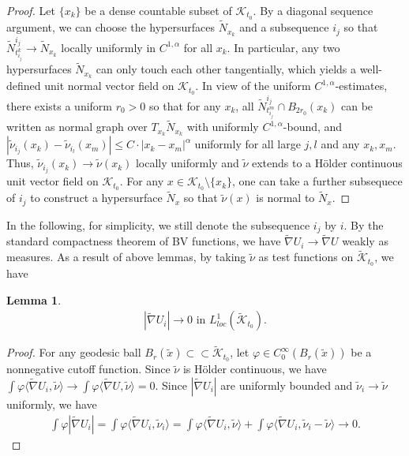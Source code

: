 \documentclass[11pt, letterpaper]{amsart}
\newtheorem{lem}[thm]{Lemma}
\theoremstyle{definition}
\theoremstyle{remark}
\begin{document}
\begin{appendix}
\begin{proof}
Let $\{x_k\} $ be a dense countable subset of $\mathcal{K}_{t_0}$. By a diagonal sequence argument, we can choose the hypersurfaces $\tilde{N}_{x_k}$ and a subsequence $i_j$ so that $\tilde{N}^{i_j}_{t ^{k}_{i_j}} \to \tilde{N}_{x_k}$ locally uniformly in $C^{1,\alpha }$ for all $x_k$. In particular, any two hypersurfaces $\tilde{N}_{x_k}$ can only touch each other tangentially, which yields a well-defined unit normal vector field on $\mathcal{K}_{t_0}$. In view of the uniform $C^{1,\alpha }$-estimates, there exists a uniform $r_0>0$ so that for any $x_k$, all $\tilde{N}^{i_j}_{t ^{m}_{i_j}} \cap B_{2 r_0}(x_k)$ can be written as normal graph over $T_{x_k} \tilde{N}_{x_k}$ with uniformly $C^{1,\alpha }$-bound, and $|\tilde{\nu }_{i_j}(x_k) - \tilde{\nu }_{i_l}(x_m)| \leq C\cdot |x_k-x_m|^{\alpha }$ uniformly for all large $j, l$ and any $x_k, x_m$. Thus, $\tilde{\nu }_{i_j}(x_k) \to \tilde{\nu }(x_k)$ locally uniformly and $\tilde{\nu }$ extends to a H\"older continuous unit vector field on $\mathcal{K}_{t_0}$. For any $x \in \mathcal{K}_{t_0}\setminus \{x_k\} $, one can take a further subsequece of $i_j$ to construct a hypersurface $\tilde{N}_{x}$ so that $\tilde{\nu }(x) $ is normal to $\tilde{N}_{x}$.
\end{proof}

In the following, for simplicity, we still denote the subsequence $i_j$ by $i$. By the standard compactness theorem of BV functions, we have $\tilde{\nabla } U_i \to \tilde{\nabla }U$ weakly as measures. As a result of above lemmas, by taking $\tilde{\nu }$ as test functions on $\tilde{\mathcal{K}}_{t_0}$, we have
\begin{lem}\label{appen-lem-L1-jump}
	\begin{align}
	|\tilde{\nabla }U_i| \to 0 \text{ in } L^{1}_{loc}(\tilde{\mathcal{K}}_{t_0}).
\end{align}
\end{lem}
\begin{proof}
	For any geodesic ball $B_{r}(\tilde{x}) \subset \subset  \tilde{\mathcal{K}}_{t_0}$, let $\varphi \in C^{\infty}_{0}(B_r(\tilde{x}) )$ be a nonnegative cutoff function. Since $\tilde{\nu }$ is H\"older continuous, we have $\int \varphi \langle \tilde{\nabla }U_i, \tilde{\nu } \rangle \to \int \varphi \langle \tilde{\nabla }U, \tilde{\nu } \rangle = 0$. Since $|\tilde{\nabla }U_i|$ are uniformly bounded and $\tilde{\nu }_i \to \tilde{\nu }$ uniformly, we have
	\begin{align*}
		\int \varphi |\tilde{\nabla }U_i| = \int \varphi \langle \tilde{\nabla }U_i, \tilde{\nu }_i \rangle = \int \varphi \langle \tilde{\nabla }U_i, \tilde{\nu } \rangle + \int \varphi \langle \tilde{\nabla }U_i, \tilde{\nu }_i - \tilde{\nu } \rangle\to 0.
	\end{align*} 
\end{proof} 


\end{appendix}
\end{document}
